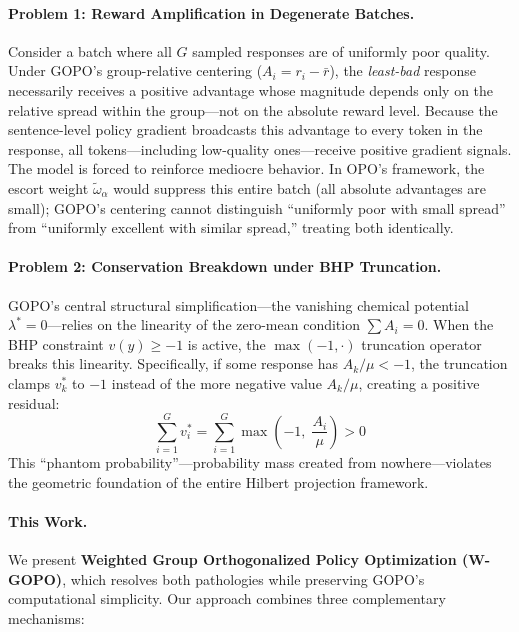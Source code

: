 \documentclass[11pt]{article}
\theoremstyle{definition}
\theoremstyle{remark}
\begin{document}
\paragraph{Problem 1: Reward Amplification in Degenerate Batches.}
Consider a batch where all $G$ sampled responses are of uniformly poor quality. Under GOPO's group-relative centering ($A_i = r_i - \bar{r}$), the \emph{least-bad} response necessarily receives a positive advantage whose magnitude depends only on the relative spread within the group---not on the absolute reward level. Because the sentence-level policy gradient broadcasts this advantage to every token in the response, all tokens---including low-quality ones---receive positive gradient signals. The model is forced to reinforce mediocre behavior. In OPO's framework, the escort weight $\tilde{\omega}_\alpha$ would suppress this entire batch (all absolute advantages are small); GOPO's centering cannot distinguish ``uniformly poor with small spread'' from ``uniformly excellent with similar spread,'' treating both identically.

\paragraph{Problem 2: Conservation Breakdown under BHP Truncation.}
GOPO's central structural simplification---the vanishing chemical potential $\lambda^* = 0$---relies on the linearity of the zero-mean condition $\sum A_i = 0$. When the BHP constraint $v(y) \geq -1$ is active, the $\max(-1, \cdot)$ truncation operator breaks this linearity. Specifically, if some response has $A_k/\mu < -1$, the truncation clamps $v_k^*$ to $-1$ instead of the more negative value $A_k/\mu$, creating a positive residual:
\begin{equation}
\label{eq:conservation_break_intro}
    \sum_{i=1}^G v_i^* = \sum_{i=1}^G \max\!\left(-1,\; \frac{A_i}{\mu}\right) > 0
\end{equation}
This ``phantom probability''---probability mass created from nowhere---violates the geometric foundation of the entire Hilbert projection framework.

\paragraph{This Work.}
We present \textbf{Weighted Group Orthogonalized Policy Optimization (W-GOPO)}, which resolves both pathologies while preserving GOPO's computational simplicity. Our approach combines three complementary mechanisms:
\end{document}
